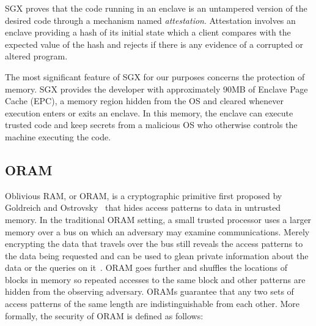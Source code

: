 \documentclass[letterpaper,twocolumn,10pt]{article}
\begin{document}
SGX proves that the code running in an enclave is an untampered version of the desired code through a mechanism named \textit{attestation}. Attestation involves an enclave providing a hash of its initial state which a client compares with the expected value of the hash and rejects if there is any evidence of a corrupted or altered program.

The most significant feature of SGX for our purposes concerns the protection of memory. SGX provides the developer with approximately 90MB of Enclave Page Cache (EPC), a memory region hidden from the OS and cleared whenever execution enters or exits an enclave. In this memory, the enclave can execute trusted code and keep secrets from a malicious OS who otherwise controls the machine executing the code.

\subsection{ORAM}
Oblivious RAM, or ORAM, is a cryptographic primitive first proposed by Goldreich and Ostrovsky~\cite{GO96} that hides access patterns to data in untrusted memory. In the traditional ORAM setting, a small trusted processor uses a larger memory over a bus on which an adversary may examine communications. Merely encrypting the data that travels over the bus still reveals the access patterns to the data being requested and can be used to glean private information about the data or the queries on it~\cite{IKK12}. ORAM goes further and shuffles the locations of blocks in memory so repeated accesses to the same block and other patterns are hidden from the observing adversary. ORAMs guarantee that any two sets of access patterns of the same length are indistinguishable from each other. More formally, the security of ORAM is defined as follows:
\end{document}
